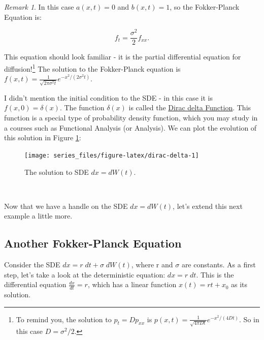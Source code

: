 \documentclass[
]{book}
\theoremstyle{definition}
\theoremstyle{definition}
\theoremstyle{definition}
\theoremstyle{remark}
\newtheorem*{remark}{Remark}
\begin{document}
\begin{remark}
{}In this case \(a(x,t)=0\) and \(b(x,t)=1\), so the Fokker-Planck Equation is:

\begin{equation*}
f_{t} = \frac{\sigma^{2}}{2} f_{xx}.
\end{equation*}

This equation should look familiar - it is the partial differential equation for diffusion!\footnote{To remind you, the solution to \(p_{t} = D p_{xx}\) is \(\displaystyle p(x,t) = \frac{1}{\sqrt{4 \pi Dt} } e^{-x^{2}/(4 D t)}\). So in this case \(D = \sigma^{2}/2\).} The solution to the Fokker-Planck equation is \(\displaystyle f(x,t) = \frac{1}{\sqrt{2 \pi \sigma^{2} t}} e^{-x^{2}/(2 \sigma^{2} t)}\).
\end{remark}

I didn't mention the initial condition to the SDE - in this case it is \(f(x,0)=\delta(x)\). The function \(\delta(x)\) is called the \href{https://en.wikipedia.org/wiki/Dirac_delta_function}{Dirac delta Function}. This function is a special type of probability density function, which you may study in a courses such as Functional Analysis (or Analysis). We can plot the evolution of this solution in Figure \ref{fig:dirac-delta}:

\begin{figure}

{\centering \texttt{[image: series\_files/figure-latex/dirac-delta-1]} 

}

\caption{The solution to SDE $dx = dW(t)$.}\label{fig:dirac-delta}
\end{figure}

~

Now that we have a handle on the SDE \(dx = dW(t)\), let's extend this next example a little more.

\hypertarget{another-fokker-planck-equation}{%
\subsection{Another Fokker-Planck Equation}\label{another-fokker-planck-equation}}

Consider the SDE \(dx = r \; dt + \sigma \; dW(t)\), where r and \(\sigma\) are constants. As a first step, let's take a look at the deterministic equation: \(dx = r \; dt\). This is the differential equation \(\displaystyle \frac{dx}{dt} = r\), which has a linear function \(x(t) = rt + x_{0}\) as its solution.
\end{document}
